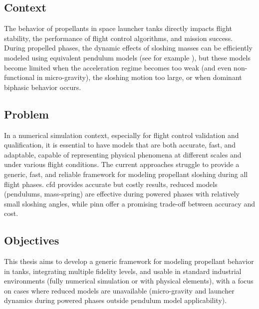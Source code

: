 \documentclass[12pt]{article}
\begin{document}
	\subsection*{Context}
	
	The behavior of propellants in space launcher tanks directly impacts flight stability, the performance of flight control algorithms, and mission success. During propelled phases, the dynamic effects of sloshing masses can be efficiently modeled using equivalent pendulum models (see for example \cite{ibrahimLiquidSloshingDynamics2005a}), but these models become limited when the acceleration regime becomes too weak (and even non-functional in micro-gravity), the sloshing motion too large, or when dominant biphasic behavior occurs.
	
	\subsection*{Problem}
	
	In a numerical simulation context, especially for flight control validation and qualification, it is essential to have models that are both accurate, fast, and adaptable, capable of representing physical phenomena at different scales and under various flight conditions.
	The current approaches struggle to provide a generic, fast, and reliable framework for modeling propellant sloshing during all flight phases. \acrshort{cfd} provides accurate but costly results, reduced models (pendulums, mass-spring) are effective during powered phases with relatively small sloshing angles, while \gls{pinn} offer a promising trade-off between accuracy and cost.
	
	\subsection*{Objectives}
	
	This thesis aims to develop a generic framework for modeling propellant behavior in tanks, integrating multiple fidelity levels, and usable in standard industrial environments (fully numerical simulation or with physical elements), with a focus on cases where reduced models are unavailable (micro-gravity and launcher dynamics during powered phases outside pendulum model applicability).
	
\end{document}
